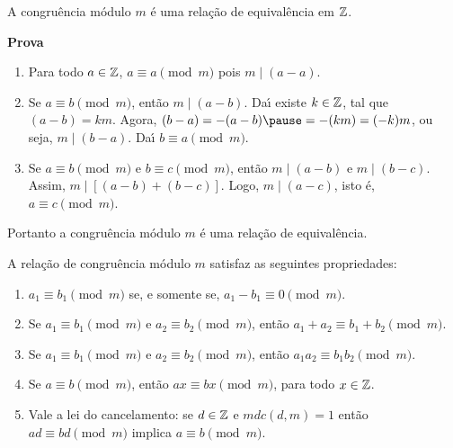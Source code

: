 \documentclass{beamer}
\begin{document}
    \begin{frame}
        \begin{proposicao}
            A congru{\^e}ncia m{\'o}dulo $m$ {\'e} uma rela{\c c}{\~a}o de equival{\^e}ncia em $\mathbb{Z}$.\pause
        \end{proposicao}
        \noindent\textbf{Prova}
        \begin{enumerate}[label={\roman*})]
            \item Para todo $a \in \mathbb{Z}$, $a\equiv a\pmod{m}$ \pause pois $m\mid (a-a)$.\pause \vspace{.3cm}

            \item Se $a\equiv b\pmod{m}$, \pause ent{\~a}o $m\mid (a - b)$. \pause Da{\'\i} existe $k \in \mathbb{Z}$, \pause tal que $(a - b) = km$. \pause Agora, $(b - a) = -(a - b) \pause = -(km) = (-k)m$, \pause ou seja, $m \mid (b - a)$. \pause Da{\'\i} $b\equiv a \pmod{m}$.\pause \vspace{.3cm}
            
            \item Se $a\equiv b\pmod{m}$ \pause e $b\equiv c\pmod{m}$, \pause ent{\~a}o $m\mid (a-b)$ \pause e $m\mid (b-c)$. \pause Assim, $m\mid [(a-b)+(b-c)]$. \pause Logo, $m\mid (a-c)$, \pause isto {\'e}, $a\equiv c\pmod{m}$.\pause
        \end{enumerate}
        Portanto a congru{\^e}ncia m{\'o}dulo $m$ {\'e} uma rela{\c c}{\~a}o de equival{\^e}ncia.\hspace{.5cm} \qedsymbol\pause
    \end{frame}
    \begin{frame}
        \begin{teorema}
            A rela{\c c}{\~a}o de congru{\^e}ncia m{\'o}dulo $m$ satisfaz as seguintes propriedades:\pause
            \begin{enumerate}[label={\roman*})]
                \item $a_{1}\equiv b_{1}\pmod{m}$ se, e somente se, $a_{1}-b_{1}\equiv 0\pmod{m}$.\pause \vspace{.3cm}

                \item Se $a_{1}\equiv b_{1}\pmod{m}$ e $a_{2}\equiv b_{2}\pmod{m}$, ent{\~a}o $a_{1}+a_{2}\equiv b_{1}+b_{2}\pmod{m}$.\pause \vspace{.3cm}
                
                \item Se $a_{1}\equiv b_{1}\pmod{m}$ e $a_{2}\equiv b_{2}\pmod{m}$, ent{\~a}o $a_{1}a_{2}\equiv b_{1}b_{2}\pmod{m}$.\label{item_provado}\pause \vspace{.3cm}

                \item Se $a\equiv b\pmod{m}$, ent{\~a}o $ax\equiv bx\pmod{m}$, para todo $x \in \mathbb{Z}$.\pause \vspace{.3cm}

                \item Vale a lei do cancelamento: se $d \in \mathbb{Z}$ e $mdc(d,m) = 1$ ent{\~a}o $ad \equiv bd \pmod{m}$ implica $a\equiv b \pmod{m}$.\pause
            \end{enumerate}
        \end{teorema}
    \end{frame}
\end{document}
